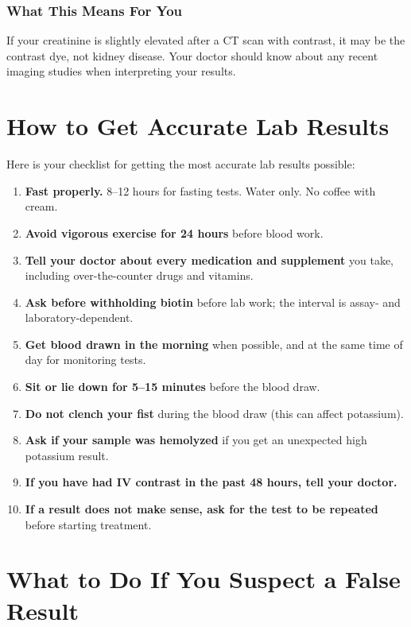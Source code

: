 \subsubsection{What This Means For You}

If your creatinine is slightly elevated after a CT scan with contrast, it may be the contrast dye, not kidney disease. Your doctor should know about any recent imaging studies when interpreting your results.

\clearpage
\section{How to Get Accurate Lab Results}

Here is your checklist for getting the most accurate lab results possible:

\begin{enumerate}
    \item \textbf{Fast properly.} 8--12 hours for fasting tests. Water only. No coffee with cream.
    \item \textbf{Avoid vigorous exercise for 24 hours} before blood work.
    \item \textbf{Tell your doctor about every medication and supplement} you take, including over-the-counter drugs and vitamins.
    \item \textbf{Ask before withholding biotin} before lab work; the interval is assay- and laboratory-dependent.
    \item \textbf{Get blood drawn in the morning} when possible, and at the same time of day for monitoring tests.
    \item \textbf{Sit or lie down for 5--15 minutes} before the blood draw.
    \item \textbf{Do not clench your fist} during the blood draw (this can affect potassium).
    \item \textbf{Ask if your sample was hemolyzed} if you get an unexpected high potassium result.
    \item \textbf{If you have had IV contrast in the past 48 hours, tell your doctor.}
    \item \textbf{If a result does not make sense, ask for the test to be repeated} before starting treatment.
\end{enumerate}

\clearpage
\section{What to Do If You Suspect a False Result}

